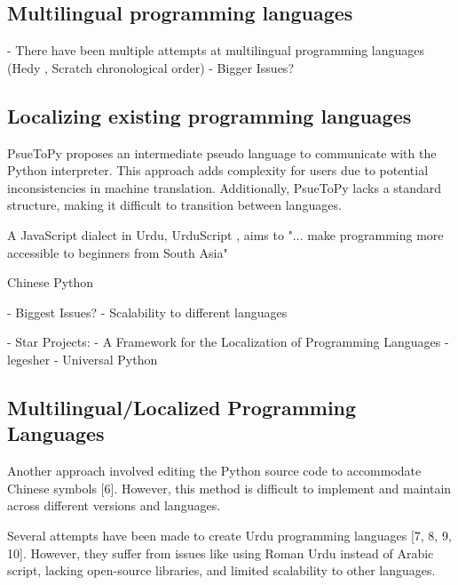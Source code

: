 \documentclass[conference]{IEEEtran}
\begin{document}
\subsection{Multilingual programming languages}

- There have been multiple attempts at multilingual programming languages (Hedy \cite{Hermans_Hedy_A_Gradual}, Scratch \cite{resnick2009scratch} chronological order)
  - Bigger Issues?

\subsection{Localizing existing programming languages}

PsueToPy \cite{wang2021pseutopy} proposes an intermediate pseudo language to communicate with the Python interpreter. This approach adds complexity for users due to potential inconsistencies in machine translation. Additionally, PsueToPy lacks a standard structure, making it difficult to transition between languages. 

A JavaScript dialect in Urdu, UrduScript \cite{Memon_UrduScript_2019}, aims to "... make programming more accessible to beginners from South Asia" \cite{Urdu_Mein_Programming}

Chinese Python

  - Biggest Issues?
    - Scalability to different languages

- Star Projects:
  - A Framework for the Localization of Programming Languages \cite{swidan2023framework}
  - legesher \cite{legesher}
  - Universal Python \cite{otten2023towards}


\subsection{Multilingual/Localized Programming Languages}


Another approach involved editing the Python source code to accommodate Chinese symbols [6]. However, this method is difficult to implement and maintain across different versions and languages.

Several attempts have been made to create Urdu programming languages [7, 8, 9, 10]. However, they suffer from issues like using Roman Urdu instead of Arabic script, lacking open-source libraries, and limited scalability to other languages.
\end{document}
